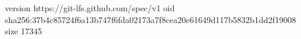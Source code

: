 version https://git-lfs.github.com/spec/v1
oid sha256:37b4c85724f6a13b747f6fda02173a7f8cea20e61649d117b5832b1dd2f19008
size 17345
